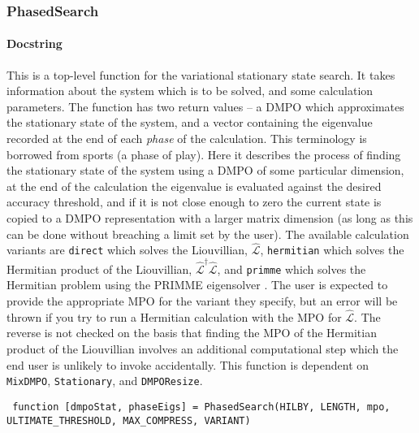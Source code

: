  \subsubsection{PhasedSearch}
 \paragraph{Docstring} This is a top-level function for the variational stationary state search. It takes information about the system which is to be solved, and some calculation parameters. The function has two return values -- a DMPO which approximates the stationary state of the system, and a vector containing the eigenvalue recorded at the end of each \emph{phase} of the calculation. This terminology is borrowed from sports (a phase of play). Here it describes the process of finding the stationary state of the system using a DMPO of some particular dimension, at the end of the calculation the eigenvalue is evaluated against the desired accuracy threshold, and if it is not close enough to zero the current state is copied to a DMPO representation with a larger matrix dimension (as long as this can be done without breaching a limit set by the user). The available calculation variants are \lstinline$direct$ which solves the Liouvillian, \(\hat{\mathcal{L}}\), \lstinline$hermitian$ which solves the Hermitian product of the Liouvillian, \(\hat{\mathcal{L}}^{\dagger}\hat{\mathcal{L}}\), and \lstinline$primme$ which solves the Hermitian problem using the PRIMME eigensolver \cite{SM10,WRS16}. The user is expected to provide the appropriate MPO for the variant they specify, but an error will be thrown if you try to run a Hermitian calculation with the MPO for \(\hat{\mathcal{L}}\). The reverse is not checked on the basis that finding the MPO of the Hermitian product of the Liouvillian involves an additional computational step which the end user is unlikely to invoke accidentally. This function is dependent on \lstinline$MixDMPO$, \lstinline$Stationary$, and \lstinline$DMPOResize$.
 \begin{lstlisting}
 function [dmpoStat, phaseEigs] = PhasedSearch(HILBY, LENGTH, mpo, ULTIMATE_THRESHOLD, MAX_COMPRESS, VARIANT) \end{lstlisting} 
